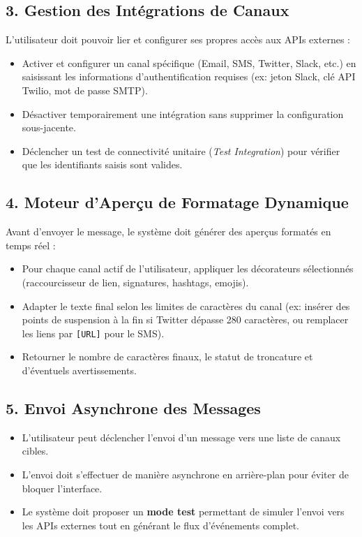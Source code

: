 \subsection{3. Gestion des Intégrations de Canaux}
L'utilisateur doit pouvoir lier et configurer ses propres accès aux APIs externes :
\begin{itemize}
    \item Activer et configurer un canal spécifique (Email, SMS, Twitter, Slack, etc.) en saisissant les informations d'authentification requises (ex: jeton Slack, clé API Twilio, mot de passe SMTP).
    \item Désactiver temporairement une intégration sans supprimer la configuration sous-jacente.
    \item Déclencher un test de connectivité unitaire (\textit{Test Integration}) pour vérifier que les identifiants saisis sont valides.
\end{itemize}

\subsection{4. Moteur d'Aperçu de Formatage Dynamique}
Avant d'envoyer le message, le système doit générer des aperçus formatés en temps réel :
\begin{itemize}
    \item Pour chaque canal actif de l'utilisateur, appliquer les décorateurs sélectionnés (raccourcisseur de lien, signatures, hashtags, emojis).
    \item Adapter le texte final selon les limites de caractères du canal (ex: insérer des points de suspension à la fin si Twitter dépasse 280 caractères, ou remplacer les liens par \texttt{[URL]} pour le SMS).
    \item Retourner le nombre de caractères finaux, le statut de troncature et d'éventuels avertissements.
\end{itemize}

\subsection{5. Envoi Asynchrone des Messages}
\begin{itemize}
    \item L'utilisateur peut déclencher l'envoi d'un message vers une liste de canaux cibles.
    \item L'envoi doit s'effectuer de manière asynchrone en arrière-plan pour éviter de bloquer l'interface.
    \item Le système doit proposer un \textbf{mode test} permettant de simuler l'envoi vers les APIs externes tout en générant le flux d'événements complet.
\end{itemize}

